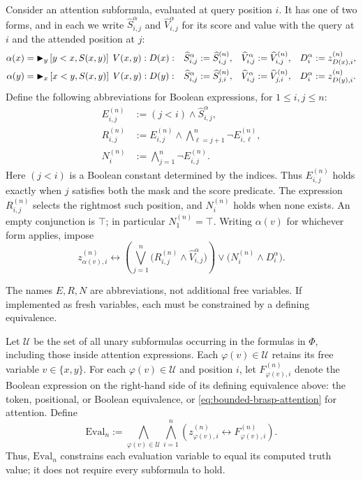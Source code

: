 \documentclass[acmsmall,screen,review,anonymous,nonacm]{PLDI/acmart}
\begin{document}
Consider an attention subformula, evaluated at query position $i$.
It has one of two forms, and in each we write $\widehat S^{\alpha}_{i,j}$
and $\widehat V^{\alpha}_{i,j}$ for its score and value with the query
at $i$ and the attended position at $j$:
\begin{align*}
\alpha(x)&={{{{\blacktriangleright}}_{y} \left[y<x, S(x,y)\right] \; V(x,y) : D(x)}}:&
\widehat S^{\alpha}_{i,j}&:=\widehat S^{(n)}_{i,j},&
\widehat V^{\alpha}_{i,j}&:=\widehat V^{(n)}_{i,j},&
D^{\alpha}_i&:=z^{(n)}_{D(x),i},\\
\alpha(y)&={{{{\blacktriangleright}}_{x} \left[x<y, S(x,y)\right] \; V(x,y) : D(y)}}:&
\widehat S^{\alpha}_{i,j}&:=\widehat S^{(n)}_{j,i},&
\widehat V^{\alpha}_{i,j}&:=\widehat V^{(n)}_{j,i},&
D^{\alpha}_i&:=z^{(n)}_{D(y),i}.
\end{align*}
Define the following abbreviations for Boolean expressions, for
$1\leq i,j\leq n$:
\begin{align*}
E^{(n)}_{i,j}&:=(j<i)\wedge\widehat S^{\alpha}_{i,j},\\
R^{(n)}_{i,j}&:=E^{(n)}_{i,j}\wedge
\bigwedge_{\ell=j+1}^{n}\neg E^{(n)}_{i,\ell},\\
N^{(n)}_i&:=\bigwedge_{j=1}^{n}\neg E^{(n)}_{i,j}.
\end{align*}
Here $(j<i)$ is a Boolean constant determined by the indices.
Thus $E^{(n)}_{i,j}$ holds exactly when $j$ satisfies both the mask
and the score predicate. The expression $R^{(n)}_{i,j}$ selects the
rightmost such position, and $N^{(n)}_i$ holds when none exists.
An empty conjunction is $\top$; in particular $N^{(n)}_1=\top$.
Writing $\alpha(v)$ for whichever form applies, impose
\begin{equation}\label{eq:bounded-brasp-attention}
z^{(n)}_{\alpha(v),i}\leftrightarrow
\left(
\bigvee_{j=1}^{n}
\bigl(R^{(n)}_{i,j}\wedge\widehat V^{\alpha}_{i,j}\bigr)
\right)
\vee\bigl(N^{(n)}_i\wedge D^{\alpha}_i\bigr).
\end{equation}



The names $E,R,N$ are abbreviations, not additional free variables.
If implemented as fresh variables, each must be constrained by a
defining equivalence.

Let $\mathcal U$ be the set of all unary subformulas occurring in
the formulas in $\Phi$, including those inside attention expressions.
Each $\varphi(v)\in\mathcal U$
retains its free variable $v\in\{x,y\}$.
For each $\varphi(v)\in\mathcal U$ and position $i$, let
$F^{(n)}_{\varphi(v),i}$ denote the Boolean expression on the right-hand
side of its defining equivalence above: the token, positional, or
Boolean equivalence, or \eqref{eq:bounded-brasp-attention} for attention.
Define
\[
\mathrm{Eval}_n :=
\bigwedge_{\varphi(v)\in\mathcal U}
\bigwedge_{i=1}^{n}
\left(
z^{(n)}_{\varphi(v),i}
\leftrightarrow F^{(n)}_{\varphi(v),i}
\right).
\]
Thus, $\mathrm{Eval}_n$ constrains each evaluation variable to equal
its computed truth value; it does not require every subformula to hold.
\end{document}
